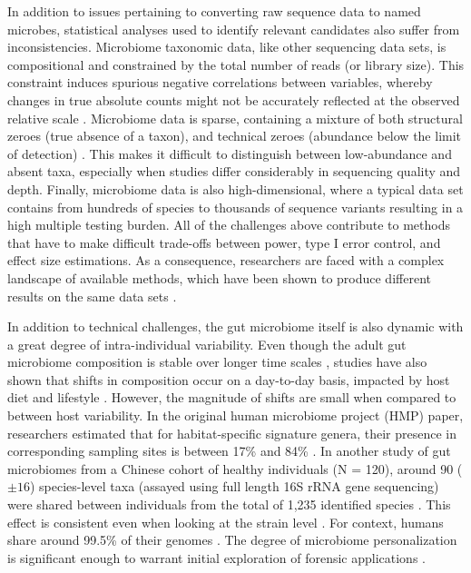 In addition to issues pertaining to converting raw sequence data to named microbes, statistical analyses used to identify relevant candidates also suffer from inconsistencies. Microbiome taxonomic data, like other sequencing data sets, is compositional \cite{gloor2017microbiome, quinn2019field} and constrained by the total number of reads (or library size). This constraint induces spurious negative correlations between variables, whereby changes in true absolute counts might not be accurately reflected at the observed relative scale \cite{lin2020analysis, morton2019establishing}. Microbiome data is sparse, containing a mixture of both structural zeroes (true absence of a taxon), and technical zeroes (abundance below the limit of detection) \cite{kaul2017analysis, silverman2020naught}. This makes it difficult to distinguish between low-abundance and absent taxa, especially when studies differ considerably in sequencing quality and depth. Finally, microbiome data is also high-dimensional, where a typical data set contains from hundreds of species to thousands of sequence variants resulting in a high multiple testing burden. All of the challenges above contribute to methods that have to make difficult trade-offs between power, type I error control, and effect size estimations. As a consequence, researchers are faced with a complex landscape of available methods, which have been shown to produce different results on the same data sets \cite{nearing2022microbiome}.   

In addition to technical challenges, the gut microbiome itself is also dynamic with a great degree of intra-individual variability. Even though the adult gut microbiome composition is stable over longer time scales \cite{consortium2012structure}, studies have also shown that shifts in composition occur on a day-to-day basis, impacted by host diet and lifestyle \cite{david2014host, david2014diet}. However, the magnitude of shifts are small when compared to between host variability. In the original human microbiome project (HMP) paper, researchers estimated that for habitat-specific signature genera, their presence in corresponding sampling sites is between 17\% and 84\% \cite{consortium2012structure}. In another study of gut microbiomes from a Chinese cohort of healthy individuals (N = 120), around 90 ($\pm 16$) species-level taxa (assayed using full length 16S rRNA gene sequencing) were shared between individuals from the total of 1,235 identified species \cite{yang2020specieslevel}. This effect is consistent even when looking at the strain level \cite{lloyd-price2017strains}. For context, humans share around 99.5\% of their genomes \cite{nationalhumangenomeresearchinstitutegenetics}. The degree of microbiome personalization is significant enough to warrant initial exploration of forensic applications \cite{fierer2010forensic}. 


